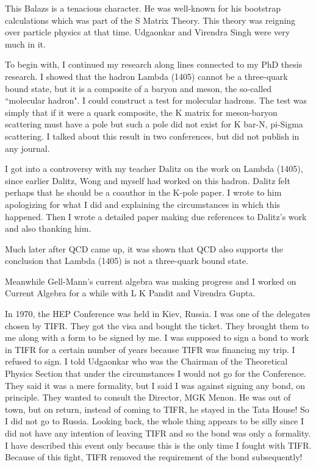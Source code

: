 This Balazs is a tenacious character. He was well-known for his 
bootstrap calculations which was part of the S Matrix Theory. This 
theory was reigning over particle physics at that time. Udgaonkar and 
Virendra Singh were very much in it.

To begin with, I continued my research along lines connected to my PhD 
thesis research. I showed that the hadron Lambda (1405) cannot be a 
three-quark bound state, but it is a composite of a baryon and meson, 
the so-called ``molecular hadron". I could construct a test for molecular 
hadrons. The test was simply that if it were a quark composite, the K 
matrix for meson-baryon scattering must have a pole but such a pole did 
not exist for K bar-N, pi-Sigma scattering. I talked about this result 
in two conferences, but did not publish in any journal.

I got into a controversy with my teacher Dalitz on the work on Lambda 
(1405), since earlier Dalitz, Wong and myself had worked on this hadron. 
Dalitz felt perhaps that he should be a coauthor in the K-pole paper. I 
wrote to him apologizing for what I did and explaining the circumstances 
in which this happened. Then I wrote a detailed paper making due 
references to Dalitz's work and also thanking him.

Much later after QCD came up, it was shown that QCD also supports the 
conclusion that Lambda (1405) is not a three-quark bound state.

Meanwhile Gell-Mann's current algebra was making progress and I worked 
on Current Algebra for a while with L K Pandit and Virendra Gupta.

In 1970, the HEP Conference was held in Kiev, Russia. I was one of the 
delegates chosen by TIFR. They got the visa and bought the ticket. They 
brought them to me along with a form to be signed by me. I was supposed 
to sign a bond to work in TIFR for a certain number of years because 
TIFR was financing my trip. I refused to sign. I told Udgaonkar who was 
the Chairman of the Theoretical Physics Section that under the 
circumstances I would not go for the Conference. They said it was a mere 
formality, but I said I was against signing any bond, on principle. They 
wanted to consult the Director, MGK Menon. He was out of town, but on 
return, instead of coming to TIFR, he stayed in the Tata House! So I did 
not go to Russia. Looking back, the whole thing appears to be silly 
since I did not have any intention of leaving TIFR and so the bond was 
only a formality. I have described this event only because this is the 
only time I fought with TIFR. Because of this fight, TIFR removed the 
requirement of the bond subsequently!

